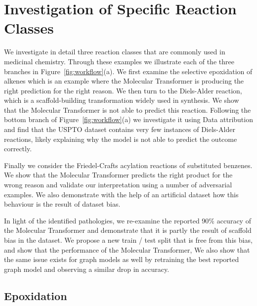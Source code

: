 \section{Investigation of Specific Reaction Classes}

We investigate in detail three reaction classes that are commonly used in medicinal chemistry. Through these examples we illustrate each of the three branches in Figure~\ref{fig:workflow}(a). We first examine the selective epoxidation of alkenes which is an example where the Molecular Transformer is producing the right prediction for the right reason. We then turn to the Diels-Alder reaction, which is a scaffold-building transformation widely used in synthesis. We show that the Molecular Transformer is not able to predict this reaction. Following the bottom branch of Figure~\ref{fig:workflow}(a) we investigate it using Data attribution and find that the USPTO dataset contains very few instances of Diels-Alder reactions, likely explaining why the model is not able to predict the outcome correctly.

Finally we consider the Friedel-Crafts acylation reactions of substituted benzenes. We show that the Molecular Transformer predicts the right product for the wrong reason and validate our interpretation using a number of adversarial examples. We also demonstrate with the help of an artificial dataset how this behaviour is the result of dataset bias. 

In light of the identified pathologies, we re-examine the reported 90\% accuracy of the Molecular Transformer and demonstrate that it is partly the result of scaffold bias in the dataset. We propose a new train / test split that is free from this bias, and show that the performance of the Molecular Transformer, We also show that the same issue exists for graph models as well by retraining the best reported graph model and observing a similar drop in accuracy.  

\subsection*{Epoxidation}

